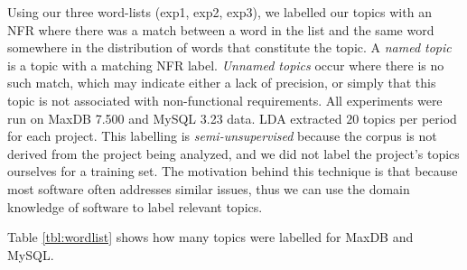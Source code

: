 \documentclass[smallextended]{svjour3}       %
\begin{document}
Using our three word-lists (\textsf{exp1}, \textsf{exp2}, \textsf{exp3}), we labelled our topics with an NFR where there was a match between a word in
the list and the same word somewhere in the distribution of words that constitute the topic.
A \emph{named topic} is a topic with a matching NFR label. \emph{Unnamed
topics} occur where there is no such match, which may indicate either a lack of precision, or simply that this topic is not associated with non-functional
requirements.
All experiments were run on MaxDB 7.500 and MySQL 3.23 data. LDA
extracted $20$ topics per period for each project.
This labelling is \emph{semi-unsupervised} because the corpus is not derived from 
the project being analyzed, and we did not label the project's topics
ourselves for a training set. The motivation behind this technique is that
because most software often addresses similar issues, thus we can use the
domain knowledge of software to label relevant topics.

Table \ref{tbl:wordlist} shows how many topics were labelled for MaxDB
and MySQL.
\end{document}
